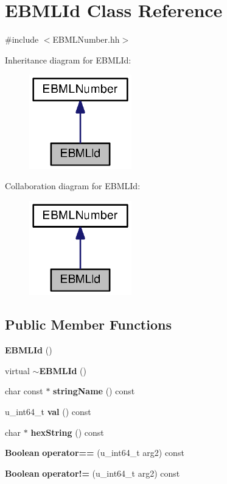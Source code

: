 \section{E\+B\+M\+L\+Id Class Reference}
\label{classEBMLId}


{\ttfamily \#include $<$E\+B\+M\+L\+Number.\+hh$>$}



Inheritance diagram for E\+B\+M\+L\+Id\+:
\nopagebreak
\begin{figure}[H]
\begin{center}
\leavevmode
\includegraphics[width=126pt]{classEBMLId__inherit__graph}
\end{center}
\end{figure}


Collaboration diagram for E\+B\+M\+L\+Id\+:
\nopagebreak
\begin{figure}[H]
\begin{center}
\leavevmode
\includegraphics[width=126pt]{classEBMLId__coll__graph}
\end{center}
\end{figure}
\subsection*{Public Member Functions}
\begin{DoxyCompactItemize}
\item 
{\bf E\+B\+M\+L\+Id} ()
\item 
virtual {\bf $\sim$\+E\+B\+M\+L\+Id} ()
\item 
char const $\ast$ {\bf string\+Name} () const 
\item 
u\+\_\+int64\+\_\+t {\bf val} () const 
\item 
char $\ast$ {\bf hex\+String} () const 
\item 
{\bf Boolean} {\bf operator==} (u\+\_\+int64\+\_\+t arg2) const 
\item 
{\bf Boolean} {\bf operator!=} (u\+\_\+int64\+\_\+t arg2) const 
\end{DoxyCompactItemize}
